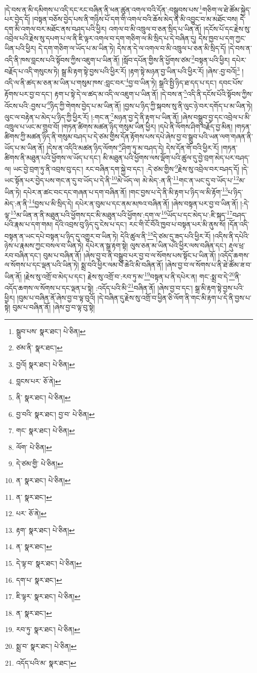 །དེ་བས་ན་མི་དམིགས་པ་འདི་དང་རང་བཞིན་ནི་ཕན་ཚུན་འགལ་བའི་དོན་:བསྒྲུབས་པས་\footnote{སྒྲུབ་པས་  སྣར་ཐང་།  པེ་ཅིན། }གཅིག་ལ་ཐེ་ཚོམ་སྐྱེད་པར་བྱེད་དོ། །བསྟན་བཅོས་བྱེད་པས་ནི་གཉིས་པོ་དག་གི་འགལ་བའི་ཆོས་མེད་ན་མི་འབྱུང་བ་མ་མཐོང་བས། དེ་དག་མི་འགལ་བར་མཐོང་ནས་བཤད་པའི་ཕྱིར། འགལ་བ་མི་འཁྲུལ་བ་ཅན་སྲིད་པ་ཡིན་ནོ། །དངོས་པོ་དང་རྗེས་སུ་འབྲེལ་པའི་རྗེས་སུ་དཔག་པ་ལ་ནི་ཇི་ལྟར་འགལ་བ་དག་གཅིག་ལ་མི་སྲིད་པ་དེ་བཞིན་དུ། དེས་ཁྱབ་པ་དག་ཀྱང་ཡིན་པའི་ཕྱིར། དེ་དག་གཅིག་ལ་ཡོད་པ་མ་ཡིན་ཏེ། དེས་ན་དེ་ལ་འགལ་བ་མི་འཁྲུལ་པ་ཅན་མི་སྲིད་དོ། །དེ་བས་ན་འདི་ནི་ཁས་བླངས་པའི་སྟོབས་ཀྱིས་འཇུག་པ་ཡིན་ནོ། །སློབ་དཔོན་གྱིས་ནི་ཕྱོགས་ཙམ་\footnote{ཙམ་ནི་  སྣར་ཐང་། }བསྟན་པའི་ཕྱིར། དཔེར་བརྗོད་པ་འདི་གསུངས་ཏེ། སྒྲ་མི་རྟག་སྟེ་བྱས་པའི་ཕྱིར་རོ། །རྟག་སྟེ་མཉན་བྱ་ཡིན་པའི་ཕྱིར་རོ། །ཞེས་:བྱ་བའོ།\footnote{བྱའོ།  སྣར་ཐང་།  པེ་ཅིན། } །འདི་ལ་ནི་ཚད་མ་ཅན་མ་ཡིན་པ་གསུམ་ཁས་:བླང་བར་\footnote{བླངས་པར་  ཅོ་ནེ། }བྱ་བ་ཡིན་ཏེ། སྒྲའི་སྤྱི་ཉིད་ཐ་དད་པ་དང་། དབང་པོས་རྟོགས་པར་བྱ་བ་དང་། རྟག་པ་སྟེ་དེ་ལ་ཚད་མ་འདི་ལ་འཇུག་པ་ཡིན་ནོ། །དེ་བས་ན་\footnote{ནི་  སྣར་ཐང་།  པེ་ཅིན། }འདི་ནི་དངོས་པོའི་སྟོབས་ཀྱིས་འོངས་པའི་:བྱས་པ་\footnote{བྱ་བའི་  སྣར་ཐང་། བྱ་བ་  པེ་ཅིན། }ཉིད་ཀྱི་གེགས་བྱེད་པ་མ་ཡིན་ནོ། །བྱས་པ་ཉིད་ཀྱི་སྐབས་སུ་ནི་ལུང་ཉེ་བར་དགོད་པ་མ་ཡིན་ཏེ། ལུང་ལ་བརྟེན་པ་མེད་པ་ཉིད་ཀྱི་ཕྱིར་རོ། །:གང་ན་\footnote{གང་  སྣར་ཐང་།  པེ་ཅིན། }མཉན་བྱ་དེ་ནི་རྟག་པ་ཡིན་ནོ། །ཞེས་བསྒྲུབ་བྱ་དང་འབྲེལ་པ་མི་འཁྲུལ་པ་ཡང་མ་གྲུབ་བོ། །གཏན་ཚིགས་མཚན་ཉིད་གསུམ་ཡིན་ཕྱིར། །དཔེ་ནི་ལོགས་ཤིག་བརྗོད་བྱ་མིན། །གཏན་ཚིགས་ཀྱི་མཚན་ཉིད་ནི་གསུམ་བཤད་པ་དེ་ཙམ་གྱིས་དོན་རྟོགས་པས་དཔེ་ཞེས་བྱ་བ་སྒྲུབ་པའི་ཡན་ལག་གཞན་ནི་ཡོད་པ་མ་ཡིན་ནོ། །དེས་ན་འདིའི་མཚན་ཉིད་ལོགས་\footnote{ལོག་  པེ་ཅིན། }ཤིག་ཏུ་མ་བཤད་དེ། དེས་དོན་གོ་བའི་ཕྱིར་རོ། །གཏན་ཚིགས་ནི་མཐུན་པའི་ཕྱོགས་ལ་ཡོད་པ་དང་། མི་མཐུན་པའི་ཕྱོགས་ལས་ལྡོག་པའི་ཚུལ་དུ་བྱེ་བྲག་མེད་པར་བཤད་ལ། ཡང་བྱེ་བྲག་ཏུ་ནི་འབྲས་བུ་དང་། རང་བཞིན་དག་སྐྱེ་བ་དང་། :དེ་ཙམ་གྱིས་\footnote{དེ་ཙམ་གྱི་  པེ་ཅིན། }རྗེས་སུ་འབྲེལ་བར་བཤད་དོ། །དེ་ཡང་སྟོན་པར་བྱེད་པས་གང་ན་དུ་བ་ཡོད་པ་དེ་ནི་\footnote{ན་  སྣར་ཐང་།  པེ་ཅིན། }མེ་ཡོད་ལ། མེ་མེད་:ན་ནི་\footnote{ན་  སྣར་ཐང་། }གང་ན་ཡང་དུ་བ་ཡོད་པ་\footnote{པར་  ཅོ་ནེ། }མ་ཡིན་ཏེ། དཔེར་ན་ཚང་བང་དང་གཞན་པ་དག་བཞིན་ནོ། །གང་བྱས་པ་དེ་ནི་མི་རྟག་པ་ཉིད་ལ་མི་རྟོག་\footnote{རྟག་  སྣར་ཐང་།  པེ་ཅིན། }པ་ཉིད་མེད་:ན་ནི་\footnote{ན་  སྣར་ཐང་། }བྱས་པ་མི་སྲིད་དེ། དཔེར་ན་བུམ་པ་དང་ནམ་མཁའ་བཞིན་ནོ། །ཞེས་བསྟན་པར་བྱ་བ་ཡིན་ནོ། །:དེ་ལྟ་\footnote{དེ་ལྟ་བ་  སྣར་ཐང་།  པེ་ཅིན། }མ་ཡིན་ན་ནི་མཐུན་པའི་ཕྱོགས་དང་མི་མཐུན་པའི་ཕྱོགས་:དག་ལ་\footnote{དག་པ་  སྣར་ཐང་། }ཡོད་པ་དང་མེད་པ་:ཇི་སྐད་\footnote{ཇི་ལྟར་  སྣར་ཐང་།  པེ་ཅིན། }བཤད་པའི་རྣམ་པ་དག་གམ། དེའི་འབྲས་བུ་ཉིད་དུ་ངེས་པ་དང་། རང་གི་ངོ་བོའི་ཁྱབ་པ་བསྟན་པར་མི་ནུས་སོ། །དོན་འདི་བསྟན་ན་ཡང་དཔེ་བསྟན་པ་ཉིད་དུ་འགྱུར་བ་ཡིན་ཏེ། དེའི་ཚུལ་ནི་\footnote{ན་  སྣར་ཐང་། }དེ་ཙམ་དུ་ཟད་པའི་ཕྱིར་རོ། །འདིས་ནི་དཔེའི་ཉེས་པ་རྣམས་ཀྱང་བསལ་བ་ཡིན་ཏེ། དཔེར་ན་སྒྲ་རྟག་སྟེ། ལུས་ཅན་མ་ཡིན་པའི་ཕྱིར་ལས་བཞིན་དང་། རྡུལ་ཕྲ་རབ་བཞིན་དང་། བུམ་པ་བཞིན་ནོ། །ཞེས་བྱ་བ་ནི་བསྒྲུབ་པར་བྱ་བ་ལ་སོགས་པས་སྟོང་པ་ཡིན་ནོ། །འདོད་ཆགས་ལ་སོགས་པ་དང་ལྡན་པའི་ཡིན་ཏེ། སྨྲ་བའི་ཕྱིར་ལམ་པོ་ཆེའི་མི་བཞིན་ནོ། །ཞེས་བྱ་བ་ལ་སོགས་པ་ནི་ཐེ་ཚོམ་ཟ་བ་ཡིན་ནོ། །རྗེས་སུ་འགྲོ་བ་མེད་པ་དང་། རྗེས་སུ་འགྲོ་བ་:རབ་ཏུ་མ་\footnote{རབ་ཏུ་  སྣར་ཐང་།  པེ་ཅིན། }བསྟན་པ་ནི་དཔེར་ན། གང་:སྨྲ་བ་དེ་\footnote{སྨྲ་བ་  སྣར་ཐང་།  པེ་ཅིན། }ནི་འདོད་ཆགས་ལ་སོགས་པ་དང་ལྡན་པ་སྟེ། :འདོད་པའི་མི་\footnote{འདོད་པའི་མ་  སྣར་ཐང་། }བཞིན་ནོ། །ཞེས་བྱ་བ་དང་། སྒྲ་མི་རྟག་སྟེ་བྱས་པའི་ཕྱིར། །བུམ་པ་བཞིན་ནོ་ཞེས་བྱ་བ་ལྟ་བུའོ། །དེ་བཞིན་དུ་རྗེས་སུ་འགྲོ་བ་ཕྱིན་ཅི་ལོག་ནི་གང་མི་རྟག་པ་དེ་ནི་བྱས་པ་སྟེ། བུམ་པ་བཞིན་ནོ། །ཞེས་བྱ་བ་ལྟ་བུ་སྟེ། 